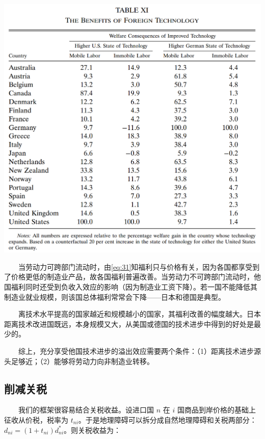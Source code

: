 \documentclass[
]{article}
\begin{document}
\begin{center}\includegraphics[width=1\linewidth]{Figures/Table11} \end{center}

　　当劳动力可跨部门流动时，由\eqref{eq:31}知福利只与价格有关，因为各国都享受到了价格更低的制造业产品，故各国福利普遍改善。当劳动力不可跨部门流动时，他国福利同时还受到负收入效应的影响（因为制造业工资下降）。若一国不能降低其制造业就业规模，则该国总体福利常常会下降------日本和德国是典型。

　　离技术水平提高的国家越近和规模越小的国家，其福利改善的幅度越大。日本距离技术改进国既远，本身规模又大，从美国或德国的技术进步中得到的好处是最少的。

　　综上，充分享受他国技术进步的溢出效应需要两个条件：（1）距离技术进步源头足够近；（2）能够将劳动力向非制造业转移。

\hypertarget{ux524aux51cfux5173ux7a0e}{%
\subsection{削减关税}\label{ux524aux51cfux5173ux7a0e}}

　　我们的框架很容易结合关税收益。设进口国 \(n\) 在 \(i\) 国商品到岸价格的基础上征收从价税，税率为 \(t_{ni}\)。于是地理障碍可以拆分成自然地理障碍和关税两部分：\(d_{n i}=\left(1+t_{n i}\right) d_{n i}^{*}\)。则关税收益为：
\end{document}
